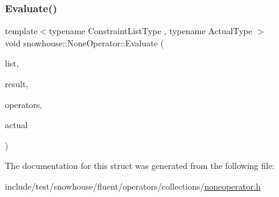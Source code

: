 \subsubsection{\texorpdfstring{Evaluate()}{Evaluate()}}
{\footnotesize\ttfamily template$<$typename Constraint\+List\+Type , typename Actual\+Type $>$ \\
void snowhouse\+::\+None\+Operator\+::\+Evaluate (\begin{DoxyParamCaption}\item[{Constraint\+List\+Type \&}]{list,  }\item[{\mbox{\hyperlink{namespacesnowhouse_a719169b1315a13161c15f25e600a8f51}{Result\+Stack}} \&}]{result,  }\item[{\mbox{\hyperlink{namespacesnowhouse_adcb10e215e6a4bbcb35722a9c7270fc6}{Operator\+Stack}} \&}]{operators,  }\item[{const Actual\+Type \&}]{actual }\end{DoxyParamCaption})\hspace{0.3cm}{\ttfamily [inline]}}



The documentation for this struct was generated from the following file\+:\begin{DoxyCompactItemize}
\item 
include/test/snowhouse/fluent/operators/collections/\mbox{\hyperlink{noneoperator_8h}{noneoperator.\+h}}\end{DoxyCompactItemize}
